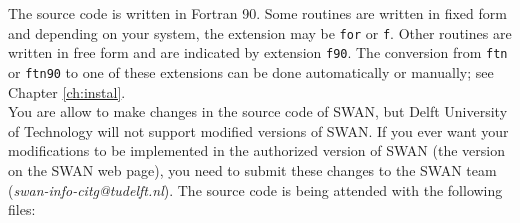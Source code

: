 \documentclass[12pt]{book}
\begin{document}
\noindent
The source code is written in Fortran 90. Some routines are written in fixed form and depending on your system,
the extension may be {\tt for} or {\tt f}. Other routines are written in free form and are indicated by
extension {\tt f90}. The conversion from {\tt ftn} or {\tt ftn90} to one of these extensions
can be done automatically or manually; see Chapter \ref{ch:instal}.
\\[2ex]
\noindent
You are allow to make changes in the source code of SWAN, but Delft University of Technology
will not support modified versions of SWAN. If you ever want your modifications to be
implemented in the authorized version of SWAN (the version on the SWAN web page), you need
to submit these changes to the SWAN team ({\it swan-info-citg@tudelft.nl}).
\newpage
\noindent
The source code is being attended with the following files:
\end{document}
